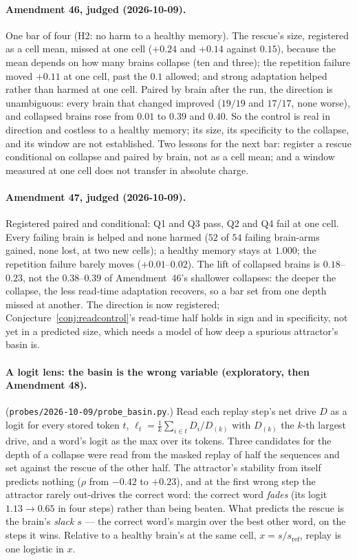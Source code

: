 \documentclass[11pt]{article}
\theoremstyle{definition}
\theoremstyle{plain}
\begin{document}
\paragraph{Amendment 46, judged (2026-10-09).} One bar of four (H2: no harm to
a healthy memory). The rescue's size, registered as a cell mean, missed at one
cell ($+0.24$ and $+0.14$ against $0.15$), because the mean depends on how many
brains collapse (ten and three); the repetition failure moved $+0.11$ at one
cell, past the $0.1$ allowed; and strong adaptation helped rather than harmed at
one cell. Paired by brain after the run, the direction is unambiguous: every
brain that changed improved ($19/19$ and $17/17$, none worse), and collapsed
brains rose from $0.01$ to $0.39$ and $0.40$. So the control is real in direction
and costless to a healthy memory; its size, its specificity to the collapse,
and its window are not established. Two lessons for the next bar: register a
rescue conditional on collapse and paired by brain, not as a cell mean; and a
window measured at one cell does not transfer in absolute charge.

\paragraph{Amendment 47, judged (2026-10-09).} Registered paired and
conditional: Q1 and Q3 pass, Q2 and Q4 fail at one cell. Every failing brain
is helped and none harmed ($52$ of $54$ failing brain-arms gained, none lost, at
two new cells); a healthy memory stays at $1.000$; the repetition failure
barely moves ($+0.01$--$0.02$). The lift of collapsed brains is $0.18$--$0.23$, not
the $0.38$--$0.39$ of Amendment~46's shallower collapses: the deeper the
collapse, the less read-time adaptation recovers, so a bar set from one depth
missed at another. The direction is now registered; Conjecture~\ref{conj:readcontrol}'s
read-time half holds in sign and in specificity, not yet in a predicted size,
which needs a model of how deep a spurious attractor's basin is.

\paragraph{A logit lens: the basin is the wrong variable (exploratory, then
Amendment 48).} (\texttt{probes/2026-10-09/probe\_basin.py}.) Read each replay
step's net drive $D$ as a logit for every stored token $t$,
$\ell_t = \frac{1}{k}\sum_{i\in t} D_i / D_{(k)}$ with $D_{(k)}$ the $k$-th largest
drive, and a word's logit as the max over its tokens. Three candidates for the
depth of a collapse were read from the masked replay of half the sequences and
set against the rescue of the other half. The attractor's stability from
itself predicts nothing ($\rho$ from $-0.42$ to $+0.23$), and at the first wrong
step the attractor rarely out-drives the correct word: the correct word
\emph{fades} (its logit $1.13 \to 0.65$ in four steps) rather than being beaten.
What predicts the rescue is the brain's \emph{slack} $s$ --- the correct word's
margin over the best other word, on the steps it wins. Relative to a healthy
brain's at the same cell, $x = s/s_{\mathrm{ref}}$, replay is one logistic in
$x$.
\end{document}
